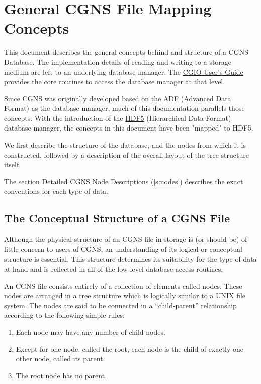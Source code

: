 \section{General CGNS File Mapping Concepts}
\label{s:general}
\thispagestyle{plain}

This document describes the general concepts behind and structure of
a CGNS Database. The implementation details of reading and writing to a
storage medium are left to an underlying database manager. The
\href{../cgio/cgio.pdf}{CGIO User's Guide} provides the core
routines to access the database manager at that level.

Since CGNS was originally developed based on the
\href{../adf/adf.pdf}{ADF} (Advanced Data Format) as the
database manager, much of this documentation parallels those concepts.
With the introduction of the \href{../hdf5/hdf5.pdf}{HDF5}
(Hierarchical Data Format) database manager, the concepts in this
document have been "mapped" to HDF5.

We first describe the structure of the database,
and the nodes from which it is constructed,
followed by a description of the overall layout
of the tree structure itself.

The section Detailed CGNS Node Descriptions (\autoref{s:nodes})
describes the exact conventions for each type of data.

\subsection{The Conceptual Structure of a CGNS File}
\label{s:filetructure}

Although the physical structure of an CGNS file in storage is (or should
be) of little concern to users of CGNS, an understanding of its logical
or conceptual structure is essential. This structure determines its
suitability for the type of data at hand and is reflected in all of the
low-level database access routines.

An CGNS file consists entirely of a collection of elements called
nodes. These nodes are arranged in a tree structure which is logically
similar to a UNIX file system. The nodes are said to be connected in a
``child-parent'' relationship according to the following simple rules:

\begin{enumerate}
\item Each node may have any number of child nodes.
\item Except for one node, called the root, each node is the child of
      exactly one other node, called its parent.
\item The root node has no parent.
\end{enumerate}

